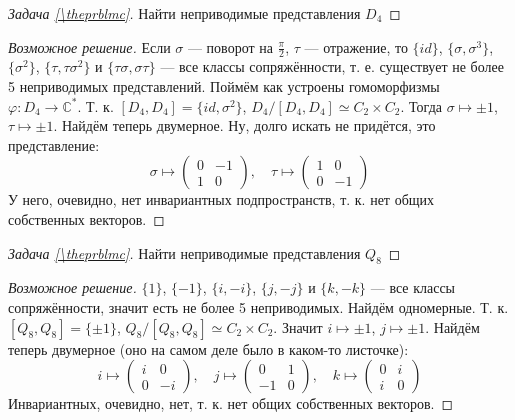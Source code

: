 \documentclass{article}
\theoremstyle{definition}
\theoremstyle{remark}
\newenvironment{solution}
{\begin{proof}[Возможное решение]}
{\end{proof}}
\newcounter{prblmc}
\newenvironment{prblm}
{\renewcommand{\qedsymbol}{}\begin{proof}[Задача \rm{\ref{\theprblmc}}]}
{\stepcounter{prblmc} \end{proof}}
\renewcommand{\C}{\mathbb{C}}
\begin{document}
\begin{prblm}
	Найти неприводимые представления $D_4$
\end{prblm}
\begin{solution}
	Если $\sigma$ --- поворот на $\frac \pi 2$, $\tau$ --- отражение, то $\{id\}$, $\{\sigma, \sigma^3\}$, $\{\sigma^2\}$, $\{\tau, \tau\sigma^2\}$ и $\{\tau\sigma, \sigma\tau\}$ --- все классы сопряжённости, т. е. существует не более 5 неприводимых представлений. Поймём как устроены гомоморфизмы $\varphi: D_4 \rightarrow \C^*$. Т. к. $[D_4, D_4] = \{id, \sigma^2\}$, $D_4/[D_4, D_4] \simeq C_2 \times C_2$. Тогда $\sigma \mapsto \pm 1$, $\tau \mapsto \pm 1$. Найдём теперь двумерное. Ну, долго искать не придётся, это представление:
\begin{equation*}
\sigma \mapsto
\begin{pmatrix}
0 & -1 \\ 
1 & 0
\end{pmatrix}
, \quad \tau \mapsto
\begin{pmatrix}
1 & 0 \\ 
0 & -1 
\end{pmatrix}
\end{equation*}
У него, очевидно, нет инвариантных подпространств, т. к. нет общих собственных векторов.
\end{solution}

\begin{prblm}
	Найти неприводимые представления $Q_8$
\end{prblm}
\begin{solution}
	$\{1\}$, $\{-1\}$, $\{i, -i\}$, $\{j, -j\}$ и $\{k, -k\}$ --- все классы сопряжённости, значит есть не более 5 неприводимых. Найдём одномерные. Т. к. $[Q_8, Q_8] = \{\pm 1\}$, $Q_8 / [Q_8, Q_8] \simeq C_2 \times C_2$. Значит $i \mapsto \pm 1$, $j \mapsto \pm 1$. Найдём теперь двумерное (оно на самом деле было в каком-то листочке):
\begin{equation*}
i \mapsto
\begin{pmatrix}
i & 0 \\
0 & -i
\end{pmatrix}
,\quad j \mapsto
\begin{pmatrix}
0 & 1 \\
-1 & 0
\end{pmatrix}
, \quad k \mapsto
\begin{pmatrix}
0 & i \\
i & 0
\end{pmatrix}
\end{equation*}
Инвариантных, очевидно, нет, т. к. нет общих собственных векторов.
\end{solution}
\end{document}

